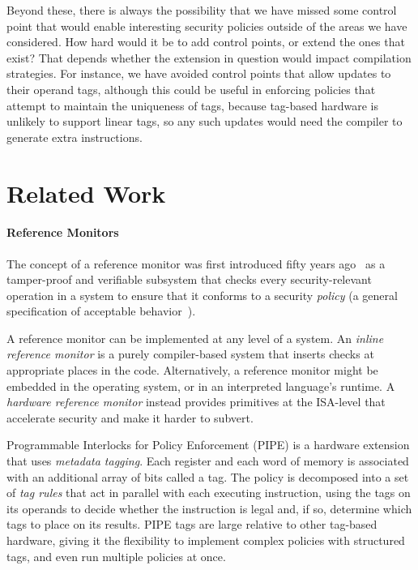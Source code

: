 \documentclass{llncs}
\begin{document}
Beyond these, there is always the possibility that we have missed some control point
that would enable interesting security policies outside of the areas we have considered.
How hard would it be to add control points, or extend the ones that exist? That depends
whether the extension in question would impact compilation strategies. For instance,
we have avoided control points that allow updates to their operand tags, although
this could be useful in enforcing policies that attempt to maintain the uniqueness of tags,
because tag-based hardware is unlikely to support linear tags, so any such updates would
need the compiler to generate extra instructions.

\section{Related Work}

\paragraph{Reference Monitors}

The concept of a reference monitor was first introduced fifty years ago~\cite{Anderson72:PlanningStudy}
as a tamper-proof and verifiable subsystem that checks every security-relevant operation in a system to
ensure that it conforms to a security {\em policy} (a general specification of acceptable behavior~\cite{Goguen82:SecurityPolicies}).

A reference monitor can be implemented at any level of a system. An {\em inline reference monitor}\cite{??}
is a purely compiler-based system that inserts checks at appropriate places in the code.
Alternatively, a reference monitor might be embedded in the operating system, or in an interpreted
language's runtime. A {\em hardware reference monitor} instead provides primitives at the ISA-level
that accelerate security and make it harder to subvert.

Programmable Interlocks for Policy Enforcement (PIPE) \cite{Dhawan14:PUMP} is a hardware extension
that uses {\em metadata tagging}. Each register and each word of memory is associated with
an additional array of bits called a tag. The policy is decomposed into a set of {\em tag rules}
that act in parallel with each executing instruction, using the tags on its operands to
decide whether the instruction is legal and, if so, determine which tags to place on its results.
PIPE tags are large relative to other tag-based hardware, giving it the flexibility
to implement complex policies with structured tags, and even run multiple policies at once.
\end{document}

